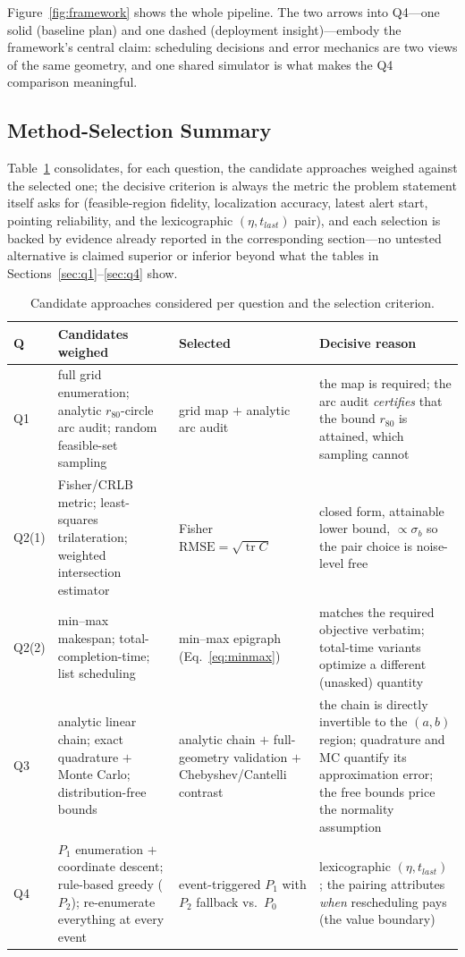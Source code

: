 Figure~\ref{fig:framework} shows the whole pipeline. The two arrows into Q4---one solid
(baseline plan) and one dashed (deployment insight)---embody the framework's central
claim: scheduling decisions and error mechanics are two views of the same geometry, and
one shared simulator is what makes the Q4 comparison meaningful.

\subsection{Method-Selection Summary}

Table~\ref{tab:methodsel} consolidates, for each question, the candidate approaches
weighed against the selected one; the decisive criterion is always the metric the
problem statement itself asks for (feasible-region fidelity, localization accuracy,
latest alert start, pointing reliability, and the lexicographic $(\eta,t_{last})$
pair), and each selection is backed by evidence already reported in the corresponding
section---no untested alternative is claimed superior or inferior beyond what the
tables in Sections~\ref{sec:q1}--\ref{sec:q4} show.

\begin{table}[!htb]\centering\footnotesize
\setlength{\tabcolsep}{3.5pt}
\caption{Candidate approaches considered per question and the selection criterion.}
\label{tab:methodsel}
\begin{tabular}{p{}p{}p{}p{}}
\toprule
Q & Candidates weighed & Selected & Decisive reason \\
\midrule
Q1 & full grid enumeration; analytic $r_{80}$-circle arc audit; random feasible-set
sampling & grid map $+$ analytic arc audit & the map is required; the arc audit
\emph{certifies} that the bound $r_{80}$ is attained, which sampling cannot \\
Q2(1) & Fisher/CRLB metric; least-squares trilateration; weighted intersection
estimator & Fisher $\mathrm{RMSE}=\sqrt{\operatorname{tr}C}$ & closed form, attainable
lower bound, $\propto\sigma_b$ so the pair choice is noise-level free \\
Q2(2) & min--max makespan; total-completion-time; list scheduling & min--max epigraph
(Eq.~\eqref{eq:minmax}) & matches the required objective verbatim; total-time variants
optimize a different (unasked) quantity \\
Q3 & analytic linear chain; exact quadrature $+$ Monte Carlo; distribution-free bounds
& analytic chain $+$ full-geometry validation $+$ Chebyshev/Cantelli contrast & the chain
is directly invertible to the $(a,b)$ region; quadrature and MC quantify its approximation
error; the free bounds price the normality assumption \\
Q4 & $P_1$ enumeration $+$ coordinate descent; rule-based greedy ($P_2$); re-enumerate
everything at every event & event-triggered $P_1$ with $P_2$ fallback vs.\ $P_0$ &
lexicographic $(\eta,t_{last})$; the pairing attributes \emph{when} rescheduling pays
(the value boundary) \\
\bottomrule
\end{tabular}
\end{table}

